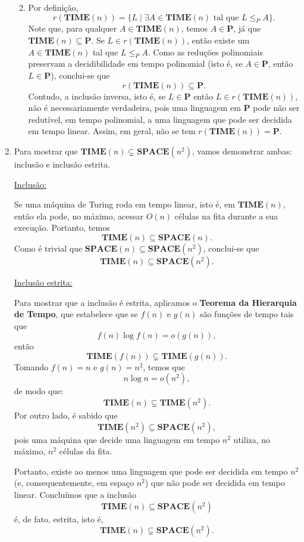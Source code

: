 \documentclass[a4paper,12pt]{article}
\begin{document}
\begin{enumerate}[label=\alph*)]
\begin{enumerate}[label=(\roman*)]
    \vspace{0.5cm}
    \item Por definição,
    \[
    r(\textbf{TIME}(n)) = \{ L \mid \exists A \in \textbf{TIME}(n) \text{ tal que } L \leq_P A \}.
    \]
    Note que, para qualquer $A \in \textbf{TIME}(n)$, temos $A \in \mathbf{P}$, já que $\textbf{TIME}(n) \subseteq \mathbf{P}$.  
    Se $L \in r(\textbf{TIME}(n))$, então existe um $A \in \textbf{TIME}(n)$ tal que $L \leq_P A$. Como as reduções polinomiais preservam a decidibilidade em tempo polinomial (isto é, se $A \in \mathbf{P}$, então $L \in \mathbf{P}$), conclui-se que 
    \[
    r(\textbf{TIME}(n)) \subseteq \mathbf{P}.
    \]
    Contudo, a inclusão inversa, isto é, se $L \in \mathbf{P}$ então $L \in r(\textbf{TIME}(n))$, não é necessariamente verdadeira, pois uma linguagem em $\mathbf{P}$ pode não ser redutível, em tempo polinomial, a uma linguagem que pode ser decidida em tempo linear.  
    Assim, em geral, não se tem $r(\textbf{TIME}(n)) = \mathbf{P}$.
  \end{enumerate}

  \vspace{0.5cm}
  \item Para mostrar que $\textbf{TIME}(n) \subsetneq \textbf{SPACE}(n^2)$, vamos demonstrar ambas: inclusão e inclusão estrita.

  \vspace{0.3cm}
  \underline{Inclusão:}  
  
  Se uma máquina de Turing roda em tempo linear, isto é, em \(\mathbf{TIME}(n)\), então ela pode, no máximo, acessar \(O(n)\) células na fita durante a sua execução.  
  Portanto, temos
  \[
  \mathbf{TIME}(n) \subseteq \mathbf{SPACE}(n).
  \]
  Como é trivial que \(\mathbf{SPACE}(n) \subseteq \mathbf{SPACE}(n^2)\), conclui-se que
  \[
  \mathbf{TIME}(n) \subseteq \mathbf{SPACE}(n^2).
  \]

  \vspace{0.3cm}
  \underline{Inclusão estrita:}  
  
  Para mostrar que a inclusão é estrita, aplicamos o \textbf{Teorema da Hierarquia de Tempo}, que estabelece que se \(f(n)\) e \(g(n)\) são funções de tempo tais que
  \[
  f(n)\log f(n) = o(g(n)),
  \]
  então
  \[
  \mathbf{TIME}(f(n)) \subsetneq \mathbf{TIME}(g(n)).
  \]
  Tomando \(f(n) = n\) e \(g(n) = n^2\), temos que
  \[
  n\log n = o(n^2),
  \]
  de modo que:
  \[
  \mathbf{TIME}(n) \subsetneq \mathbf{TIME}(n^2).
  \]
  Por outro lado, é sabido que
  \[
  \mathbf{TIME}(n^2) \subseteq \mathbf{SPACE}(n^2),
  \]
  pois uma máquina que decide uma linguagem em tempo \(n^2\) utiliza, no máximo, \(n^2\) células da fita.

  Portanto, existe ao menos uma linguagem que pode ser decidida em tempo \(n^2\) (e, consequentemente, em espaço \(n^2\)) que não pode ser decidida em tempo linear.  
  Concluímos que a inclusão
  \[
  \mathbf{TIME}(n) \subseteq \mathbf{SPACE}(n^2)
  \]
  é, de fato, estrita, isto é,
  \[
  \mathbf{TIME}(n) \subsetneq \mathbf{SPACE}(n^2).
  \]
\end{enumerate}
\end{document}
